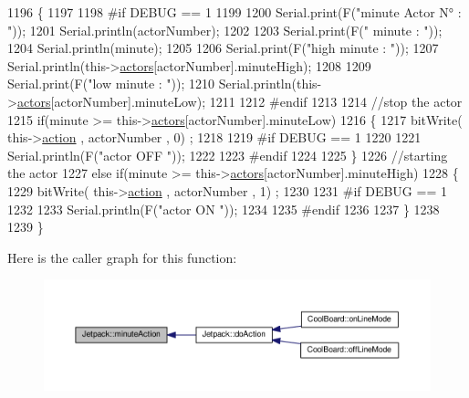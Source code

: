 \begin{DoxyCode}
1196 \{
1197 
1198 \textcolor{preprocessor}{#if DEBUG == 1}
1199     
1200     Serial.print(F(\textcolor{stringliteral}{"minute Actor N° : "}));
1201     Serial.println(actorNumber);
1202 
1203     Serial.print(F(\textcolor{stringliteral}{" minute : "}));
1204     Serial.println(minute);
1205 
1206     Serial.print(F(\textcolor{stringliteral}{"high minute : "}));
1207     Serial.println(this->\hyperlink{class_jetpack_a7e16d2f97837f9712a2e6de1c50d99db}{actors}[actorNumber].minuteHigh);
1208 
1209     Serial.print(F(\textcolor{stringliteral}{"low minute : "}));
1210     Serial.println(this->\hyperlink{class_jetpack_a7e16d2f97837f9712a2e6de1c50d99db}{actors}[actorNumber].minuteLow);
1211 
1212 \textcolor{preprocessor}{#endif}
1213 
1214     \textcolor{comment}{//stop the actor    }
1215     \textcolor{keywordflow}{if}(minute >= this->\hyperlink{class_jetpack_a7e16d2f97837f9712a2e6de1c50d99db}{actors}[actorNumber].minuteLow)
1216     \{
1217         bitWrite( this->\hyperlink{class_jetpack_aca3142925a7b0834b34ae91d26af7765}{action} , actorNumber , 0) ;
1218 
1219 \textcolor{preprocessor}{    #if DEBUG == 1 }
1220 
1221         Serial.println(F(\textcolor{stringliteral}{"actor OFF "}));
1222 
1223 \textcolor{preprocessor}{    #endif  }
1224 
1225     \}   
1226     \textcolor{comment}{//starting the actor}
1227     \textcolor{keywordflow}{else} \textcolor{keywordflow}{if}(minute >= this->\hyperlink{class_jetpack_a7e16d2f97837f9712a2e6de1c50d99db}{actors}[actorNumber].minuteHigh)
1228     \{
1229         bitWrite( this->\hyperlink{class_jetpack_aca3142925a7b0834b34ae91d26af7765}{action} , actorNumber , 1) ;
1230 
1231 \textcolor{preprocessor}{    #if DEBUG == 1 }
1232 
1233         Serial.println(F(\textcolor{stringliteral}{"actor ON "}));
1234 
1235 \textcolor{preprocessor}{    #endif  }
1236 
1237     \}
1238 
1239 \} 
\end{DoxyCode}
Here is the caller graph for this function\+:\nopagebreak
\begin{figure}[H]
\begin{center}
\leavevmode
\includegraphics[width=350pt]{df/d1d/class_jetpack_a97da41141c7b53ddee61143519c8d17d_icgraph}
\end{center}
\end{figure}
\mbox{\label{class_jetpack_ac1a49ab4867718cdb415ad74c2066b9d}} 
